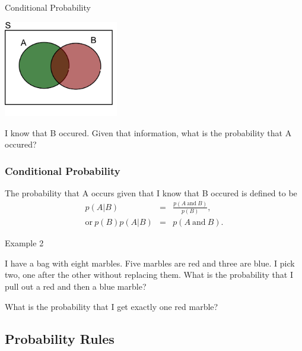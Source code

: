 \begin{frame}{Conditional Probability}

  \includegraphics[width=5cm]{img/vennDiagram}

  I know that B occured. Given that information, what is the
  probability that A occured?

  
\end{frame}

\begin{frame}
  \frametitle{Conditional Probability}

  \begin{definition}
    The probability that A occurs given that I know that B occured is
    defined to be 
    \begin{eqnarray*}
      p(A|B) & = & \frac{p(A \mathrm{~and~} B)}{p(B)}, \\
      \mathrm{or~} 
      p(B) p(A|B)  &  =  & p(A \mathrm{~and~} B).
    \end{eqnarray*}
  \end{definition}

\end{frame}


\begin{frame}{Example 2}

  I have a bag with eight marbles. Five marbles are red and three are
  blue. I pick two, one after the other without replacing them. What
  is the probability that I pull out a red and then a blue marble?

  \vfill

  {

    What is the probability that I get exactly one red marble?
    \vfill

  }
  
\end{frame}


\subsection{Probability Rules}


